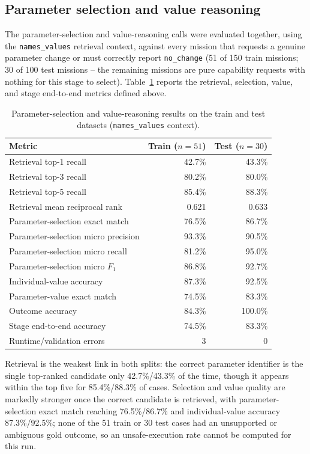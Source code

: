 \subsection{Parameter selection and value reasoning}

The parameter-selection and value-reasoning calls were evaluated together, using the \texttt{names\_values} retrieval context, against every mission that requests a genuine parameter change or must correctly report \texttt{no\_change} (51 of 150 train missions; 30 of 100 test missions -- the remaining missions are pure capability requests with nothing for this stage to select). Table~\ref{tab:parameter-reasoning-results} reports the retrieval, selection, value, and stage end-to-end metrics defined above.

\begin{table}[H]
\centering
\caption{Parameter-selection and value-reasoning results on the train and test datasets (\texttt{names\_values} context).}
\label{tab:parameter-reasoning-results}
\begin{tabular}{lrr}
\toprule
Metric & Train ($n=51$) & Test ($n=30$) \\
\midrule
Retrieval top-1 recall & 42.7\% & 43.3\% \\
Retrieval top-3 recall & 80.2\% & 80.0\% \\
Retrieval top-5 recall & 85.4\% & 88.3\% \\
Retrieval mean reciprocal rank & 0.621 & 0.633 \\
Parameter-selection exact match & 76.5\% & 86.7\% \\
Parameter-selection micro precision & 93.3\% & 90.5\% \\
Parameter-selection micro recall & 81.2\% & 95.0\% \\
Parameter-selection micro $F_1$ & 86.8\% & 92.7\% \\
Individual-value accuracy & 87.3\% & 92.5\% \\
Parameter-value exact match & 74.5\% & 83.3\% \\
Outcome accuracy & 84.3\% & 100.0\% \\
Stage end-to-end accuracy & 74.5\% & 83.3\% \\
Runtime/validation errors & 3 & 0 \\
\bottomrule
\end{tabular}
\end{table}

Retrieval is the weakest link in both splits: the correct parameter identifier is the single top-ranked candidate only 42.7\%/43.3\% of the time, though it appears within the top five for 85.4\%/88.3\% of cases. Selection and value quality are markedly stronger once the correct candidate is retrieved, with parameter-selection exact match reaching 76.5\%/86.7\% and individual-value accuracy 87.3\%/92.5\%; none of the 51 train or 30 test cases had an unsupported or ambiguous gold outcome, so an unsafe-execution rate cannot be computed for this run.

